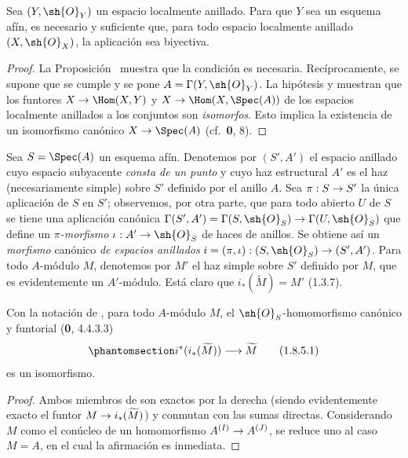 \documentclass[oneside,10pt]{amsart}
\makeatletter
\newcommand{\ega@arrow}[2]{\mathchoice{#1}{#2}{#2}{#2}}
\renewcommand{\to}{\ega@arrow{\longrightarrow}{\rightarrow}}
\let\EGAOriginalLabel\label
\renewcommand{\label}[1]{\phantomsection\EGAOriginalLabel{#1}}
\makeatother
\begin{document}
\begin{corollary}[1.8.3]
\label{ega2:addendum:I.1.8.3-fr}
Sea $(Y,\sh{O}_Y)$ un espacio localmente anillado. Para que $Y$ sea un
esquema afín, es necesario y suficiente que, para todo espacio
localmente anillado $(X,\sh{O}_X)$, la aplicación \textup{} sea
biyectiva.
\end{corollary}

\begin{proof}
La Proposición~ muestra que la condición es necesaria.
Recíprocamente, se supone que se cumple y se pone
$A=\Gamma(Y,\sh{O}_Y)$. La hipótesis y  muestran que los
funtores
$X\to\Hom(X,Y)$ y $X\to\Hom(X,\Spec(A))$
de los espacios localmente anillados a los conjuntos son \emph{isomorfos}.
Esto implica la existencia de un isomorfismo canónico
$X\to\Spec(A)$ (cf.~\textbf 0, 8).
\end{proof}

\begin{env}[1.8.4]
\label{ega2:addendum:I.1.8.4-fr}
Sea $S=\Spec(A)$ un esquema afín. Denotemos por $(S',A')$ el espacio
anillado cuyo espacio subyacente \emph{consta de un punto} y cuyo haz
estructural $A'$ es el haz (necesariamente simple) sobre $S'$ definido
por el anillo $A$. Sea $\pi:S\to S'$ la única aplicación de $S$ en $S'$; observemos, por otra parte, que para todo
abierto $U$ de $S$ se tiene una aplicación canónica
$\Gamma(S',A')=\Gamma(S,\sh{O}_S)\to\Gamma(U,\sh{O}_S)$
que define un \emph{$\pi$-morfismo} $\iota:A'\to\sh{O}_S$ de haces de anillos.
Se obtiene así un \emph{morfismo} canónico \emph{de espacios anillados}
$i=(\pi,\iota):(S,\sh{O}_S)\to(S',A')$.
Para todo $A$-módulo $M$, denotemos por $M'$ el haz simple sobre $S'$
definido por $M$, que es evidentemente un $A'$-módulo. Está claro que
$i_*(\widetilde M)=M'$ (1.3.7).
\end{env}

\begin{lemma}[1.8.5]
\label{ega2:addendum:I.1.8.5-fr}
Con la notación de \textup{}, para todo $A$-módulo $M$, el
$\sh{O}_S$-homomorfismo canónico y funtorial \textup{(\textbf{0}, 4.4.3.3)}
\begin{equation}
\label{ega2:addendum:I.1.8.5.1-fr}
  i^*(i_*(\widetilde M))\to\widetilde M
\tag{1.8.5.1}
\end{equation}
es un isomorfismo.
\end{lemma}

\begin{proof}
Ambos miembros de  son exactos por la derecha
(siendo evidentemente exacto el funtor
$M\to i_*(\widetilde M)$) y conmutan con las sumas directas.
Considerando $M$ como el conúcleo de un homomorfismo
$A^{(I)}\to A^{(J)}$, se reduce uno al caso $M=A$, en el cual la
afirmación es inmediata.
\end{proof}
\end{document}

